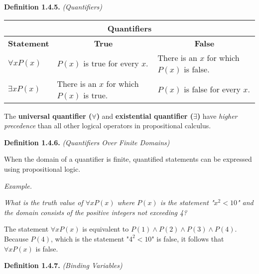 \documentclass[12pt, letterpaper]{article}
\begin{document}
\bigskip
\bigskip

\textbf{Definition 1.4.5.} \textit{(Quantifiers)}
\medskip

\medskip
\begin{center}
\begin{tabular}{|lllll|}
\hline
\multicolumn{5}{|c|}{\textbf{Quantifiers}}                                                                          \\ \hline
\multicolumn{1}{|c|}{\textbf{Statement}} & \multicolumn{2}{c|}{\textbf{True}} & \multicolumn{2}{c|}{\textbf{False}} \\ \hline
    \multicolumn{1}{|p{3em}|}{$ \forall x P(x) $}                   & \multicolumn{2}{p{5cm}|}{ $P(x) $ is true for every $ x $. }              & \multicolumn{2}{p{5cm}|}{There is an $ x $ for which $ P(x) $ is false.}               \\ \hline
    \multicolumn{1}{|p{3em}|}{$ \exists x P(x) $}                   & \multicolumn{2}{p{5cm}|}{There is an $ x $ for which $ P(x) $ is true.}              & \multicolumn{2}{p{5cm}|}{ $ P(x) $ is false for every $ x $. }               \\ \hline
\end{tabular}
\end{center}
\medskip

The \textbf{universal quantifier ($ \forall $)} and \textbf{existential quantifier ($ \exists $)} have \textit{higher precedence} than all other logical operators in propositional calculus.

\bigskip
\bigskip

\textbf{Definition 1.4.6.} \textit{(Quantifiers Over Finite Domains)}
\medskip

When the domain of a quantifier is finite, quantified statements can be expressed using propositional logic.
\bigskip

\textit{Example.}
\medskip

\textit{What is the truth value of $ \forall x P(x) $ where $ P(x) $ is the statement "$ x^2 < 10 $" and the domain consists of the positive integers not exceeding 4?}
\medskip

The statement $ \forall x P(x) $ is equivalent to $ P(1) \wedge P(2) \wedge P(3) \wedge P(4) $. Because $ P(4) $, which is the statement "$ 4^2 < 10 $" is false, it follows that $ \forall x P(x) $ is false.

\bigskip
\bigskip

\textbf{Definition 1.4.7.} \textit{(Binding Variables)}
\medskip
\end{document}
